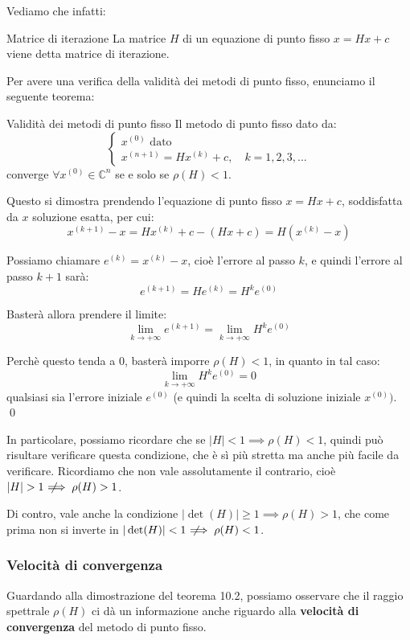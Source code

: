 \documentclass[a4paper,11pt]{article}
\begin{document}
Vediamo che infatti:
\begin{definition}{Matrice di iterazione}
	La matrice $H$ di un equazione di punto fisso $x = H x + c$ viene detta matrice di iterazione.
\end{definition}

Per avere una verifica della validità dei metodi di punto fisso, enunciamo il seguente teorema:
\begin{theorem}{Validità dei metodi di punto fisso}
	Il metodo di punto fisso dato da:
\[
	\begin{cases}
		x^{(0)} \text{ dato} \\
		x^{(n + 1)} = H x^{(k)} + c, \quad k = 1, 2, 3, ...
	\end{cases}
\]
converge $\forall x^{(0)} \in \mathbb{C}^n$ se e solo se $\rho(H) < 1$.
\end{theorem}

Questo si dimostra prendendo l'equazione di punto fisso $x = H x + c$, soddisfatta da $x$ soluzione esatta, per cui:
$$
x^{(k + 1)} - x = H x^{(k)} + c - (H x + c) = H ( x^{(k)} - x )
$$

Possiamo chiamare $e^{(k)} = x^{(k)} - x$, cioè l'errore al passo $k$, e quindi l'errore al passo $k + 1$ sarà:
$$
e^{(k + 1)} = H e^{(k)} = H^k e^{(0)}
$$

Basterà allora prendere il limite:
$$
\lim_{k \rightarrow + \infty} e^{(k + 1)} = \lim_{k \rightarrow + \infty} H^k e^{(0)}
$$

Perchè questo tenda a $0$, basterà imporre $\rho(H) < 1$, in quanto in tal caso:
$$
\lim_{k \rightarrow + \infty} H^k e^{(0)} = 0
$$
qualsiasi sia l'errore iniziale $e^{(0)}$ (e quindi la scelta di soluzione iniziale $x^{(0)})$. \qed

In particolare, possiamo ricordare che se $|H| < 1 \implies \rho(H) < 1$, quindi può risultare verificare questa condizione, che è sì più stretta ma anche più facile da verificare.
Ricordiamo che non vale assolutamente il contrario, cioè $|H| > 1 \;\not\!\!\!\implies \rho(H) > 1$. 

Di contro, vale anche la condizione $|\det(H)| \geq 1 \implies \rho(H) > 1$, che come prima non si inverte in $|\det(H)| < 1 \;\not\!\!\!\implies \rho(H) < 1$.

\subsubsection{Velocità di convergenza}
Guardando alla dimostrazione del teorema 10.2, possiamo osservare che il raggio spettrale $\rho(H)$ ci dà un informazione anche riguardo alla \textbf{velocità di convergenza} del metodo di punto fisso.
\end{document}
